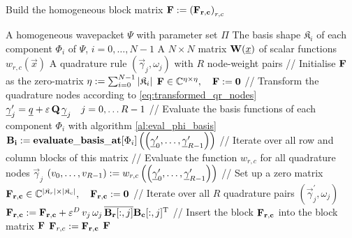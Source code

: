 \begin{algorithm}
\caption{Build the homogeneous block matrix $\mathbf{F} := \left(\mathbf{F_{r,c}}\right)_{r,c}$}
\label{al:build_block_matrix_homog}
\begin{algorithmic}
  \REQUIRE A homogeneous wavepacket $\Psi$ with parameter set $\Pi$
  \REQUIRE The basis shape $\mathfrak{K}_i$ of each component $\Phi_i$ of $\Psi$, $i = 0,\ldots, N-1$
  \REQUIRE A $N \times N$ matrix $\mathbf{W}(\underline{x})$ of scalar functions $w_{r,c}(\vec{x})$
  \REQUIRE A quadrature rule $(\vec{\gamma}_j, \omega_j)$ with $R$ node-weight pairs
  \STATE // Initialise $\mathbf{F}$ as the zero-matrix
  \STATE $\eta := \sum_{i=0}^{N-1} |\mathfrak{K}_i|$
  \STATE $\mathbf{F} \in \mathbb{C}^{\eta \times \eta}, \quad \mathbf{F} := \mathbf{0}$
  \STATE // Transform the quadrature nodes according to \eqref{eq:transformed_qr_nodes}
  \STATE $\underline{\gamma}_j^\prime = \underline{q} + \varepsilon \, \mathbf{Q} \, \underline{\gamma}_j \quad j = 0, \ldots R-1$
  \STATE // Evaluate the basis functions of each component $\Phi_i$ with algorithm \ref{al:eval_phi_basis}
    \STATE $\mathbf{B_i} := \mathbf{evaluate\_basis\_at}[\Phi_i]\left(\left(\underline{\gamma}_0^\prime, \ldots, \underline{\gamma}_{R-1}^\prime\right)\right)$
  \ENDFOR
  \STATE // Iterate over all row and column blocks of this matrix
      \STATE // Evaluate the function $w_{r,c}$ for all quadrature nodes $\vec{\gamma}_j$
      \STATE $\left(v_0, \ldots, v_{R-1}\right) := w_{r,c}\left( \left(\underline{\gamma}_0^\prime, \ldots, \underline{\gamma}_{R-1}^\prime\right) \right)$
      \STATE // Set up a zero matrix
      \STATE $\mathbf{F_{r,c}} \in \mathbb{C}^{|\mathfrak{K}_r| \times |\mathfrak{K}_c|}, \quad \mathbf{F_{r,c}} := \mathbf{0}$
      \STATE // Iterate over all $R$ quadrature pairs $\left(\vec{\gamma}^\prime_j, \omega_j\right)$
        \STATE $\mathbf{F_{r,c}} := \mathbf{F_{r,c}} + \varepsilon^D \, v_{j} \, \omega_j \, \overline{\mathbf{B_r}[:,j]} \mathbf{B_c}[:,j]{}^{\textnormal{T}}$
      \ENDFOR
      \STATE // Insert the block $\mathbf{F_{r,c}}$ into the block matrix $\mathbf{F}$
      \STATE $\mathbf{F}_{r,c} := \mathbf{F_{r,c}}$
    \ENDFOR
  \ENDFOR
  \RETURN $\mathbf{F}$
\end{algorithmic}
\end{algorithm}


